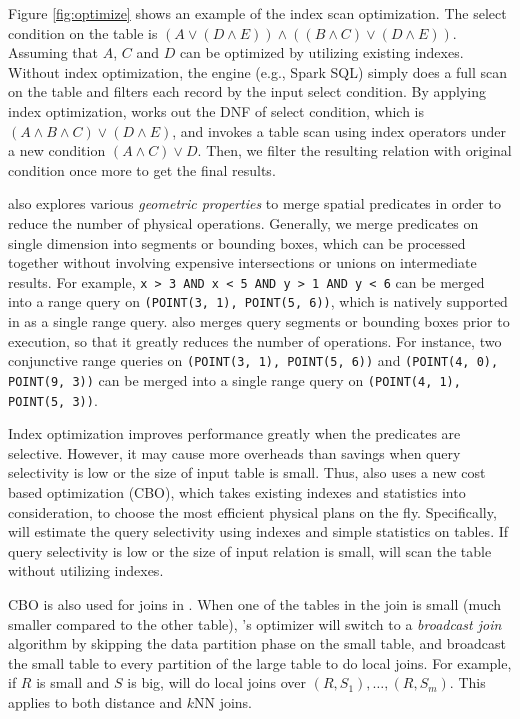 Figure \ref{fig:optimize} shows an example of the index scan
optimization. The select condition on the table is
$(A \vee (D \wedge E)) \wedge ((B \wedge C) \vee (D \wedge E))$.
Assuming that $A$, $C$ and $D$ can be optimized by utilizing existing
indexes. Without index optimization, the engine (e.g., Spark SQL)
simply does a full scan on the table and filters each record by the
input select condition. By applying index optimization, \name works
out the DNF of select condition, which is
$(A \wedge B \wedge C) \vee (D \wedge E)$, and invokes a table scan
using index operators under a new condition $(A \wedge C) \vee D$.
Then, we filter the resulting relation with original condition once
more to get the final results.

\name also explores various {\em geometric properties} to merge
spatial predicates in order to reduce the number of physical
operations. Generally, we merge predicates on single dimension into
segments or bounding boxes, which can be processed together without
involving expensive intersections or unions on intermediate
results. For example, \texttt{x > 3 AND x < 5 AND y > 1 AND y < 6} can
be merged into a range query on \texttt{(POINT(3, 1), POINT(5, 6))},
which is natively supported in \name as a single range query. \name
also merges query segments or bounding boxes prior to execution, so
that it greatly reduces the number of operations. For instance, two
conjunctive range queries on \texttt{(POINT(3, 1), POINT(5, 6))} and
\texttt{(POINT(4, 0), POINT(9, 3))} can be merged into a single range
query on \texttt{(POINT(4, 1), POINT(5, 3))}.

Index optimization improves performance greatly when the predicates
are selective.  However, it may cause more overheads than savings when
query selectivity is low or the size of input table is small. Thus,
\name also uses a new cost based optimization (CBO), which takes
existing indexes and statistics into consideration, to choose the most
efficient physical plans on the fly. Specifically, \name will estimate
the query selectivity using indexes and simple statistics on
tables. %
If query selectivity is low or the size of input relation is small,
\name will scan the table without utilizing indexes.

CBO is also used for joins in \name. When one of the tables in the
join is small (much smaller compared to the other table), \name's
optimizer will switch to a {\em broadcast join} algorithm by skipping
the data partition phase on the small table, and broadcast the small
table to every partition of the large table to do local joins. For
example, if $R$ is small and $S$ is big, \name will do local joins
over $(R, S_1), \ldots, (R, S_m)$. This applies to both distance and
$k$NN joins.


